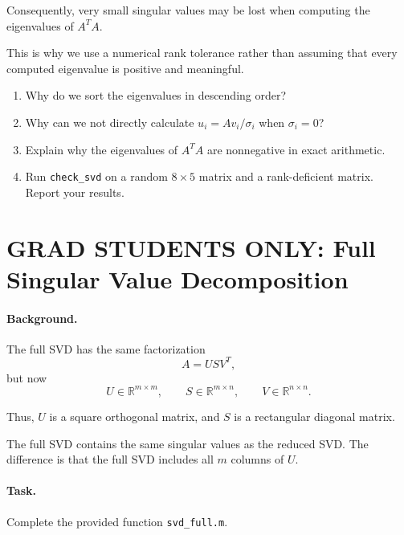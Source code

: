 \documentclass{ximera}
\begin{document}
Consequently, very small singular values may be lost when
computing the eigenvalues of $A^TA$.

This is why we use a numerical rank tolerance rather than
assuming that every computed eigenvalue is positive and meaningful.

\begin{exercise}

\begin{enumerate}
    \item Why do we sort the eigenvalues in descending order?

    \item Why can we not directly calculate
    $u_i=Av_i/\sigma_i$ when $\sigma_i=0$?

    \item Explain why the eigenvalues of $A^TA$ are nonnegative
    in exact arithmetic.

    \item Run \texttt{check\_svd} on a random $8\times5$ matrix
    and a rank-deficient matrix. Report your results.
\end{enumerate}

\end{exercise}

\section{GRAD STUDENTS ONLY: Full Singular Value Decomposition}

\paragraph{Background.}

The full SVD has the same factorization
\[
A=USV^T,
\]
but now
\[
U\in\mathbb{R}^{m\times m},\qquad
S\in\mathbb{R}^{m\times n},\qquad
V\in\mathbb{R}^{n\times n}.
\]

Thus, $U$ is a square orthogonal matrix, and $S$ is a rectangular
diagonal matrix.

The full SVD contains the same singular values as the reduced SVD.
The difference is that the full SVD includes all $m$ columns
of $U$.

\paragraph{Task.}

Complete the provided function \texttt{svd\_full.m}.
\end{document}
